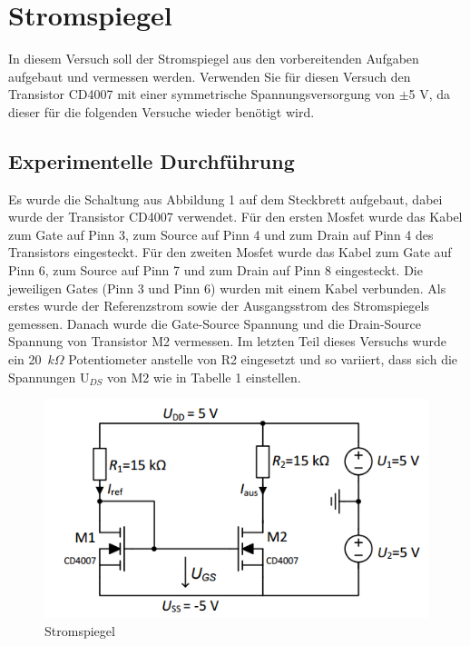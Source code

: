 \section{Stromspiegel}
In diesem Versuch soll der Stromspiegel aus den vorbereitenden Aufgaben
aufgebaut und vermessen werden. Verwenden Sie f\"ur diesen Versuch den Transistor
CD4007 mit einer symmetrische Spannungsversorgung von $\pm$5 V, da dieser f\"ur die
folgenden Versuche wieder ben\"otigt wird.
\subsection{Experimentelle Durchf\"uhrung}
Es wurde die Schaltung aus Abbildung 1 auf dem Steckbrett aufgebaut, dabei wurde der Transistor CD4007 verwendet. F\"ur den ersten Mosfet wurde das Kabel zum Gate auf Pinn 3, zum Source auf Pinn 4 und zum Drain auf Pinn 4 des Transistors eingesteckt. F\"ur den zweiten Mosfet wurde das Kabel zum Gate auf Pinn 6, zum Source auf Pinn 7 und zum Drain auf Pinn 8 eingesteckt. Die jeweiligen Gates (Pinn 3 und Pinn 6) wurden mit einem Kabel verbunden. Als erstes wurde der Referenzstrom sowie der Ausgangsstrom des Stromspiegels gemessen. Danach wurde die Gate-Source Spannung und die Drain-Source Spannung von Transistor M2 vermessen. Im letzten Teil dieses Versuchs wurde ein 20~$k \Omega$ Potentiometer anstelle von R2 eingesetzt und so variiert, dass sich die Spannungen U$_{DS}$ von M2 wie in Tabelle 1 einstellen.
\begin{figure}[!ht]
\begin{center}
\includegraphics[scale=0.7]{Stromspiegel}
\caption{Stromspiegel}
\end{center}
\end{figure}
\clearpage
